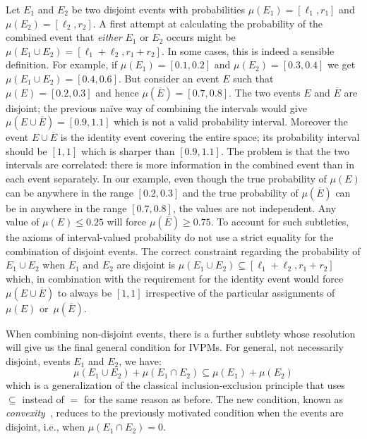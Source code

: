 \documentclass[english,reprint, aps, prl,superscriptaddress, showpacs,
showkeys, longbibliography, amsmath, amssymb]{revtex4-1}
\theoremstyle{plain}
\theoremstyle{definition}
\begin{document}
Let $E_1$ and $E_2$ be two disjoint events with probabilities
$\mu(E_1)=[\ell_1,r_1]$ and $\mu(E_2)=[\ell_2,r_2]$. A first attempt
at calculating the probability of the combined event that
\emph{either} $E_1$ or $E_2$ occurs might be
$\mu(E_1\cup E_2) = [\ell_1+\ell_2,r_1+r_2]$. In some cases, this is
indeed a sensible definition. For example, if $\mu(E_1)=[0.1,0.2]$ and
$\mu(E_2)=[0.3,0.4]$ we get $\mu(E_1\cup E_2) = [0.4,0.6]$. But
consider an event $E$ such that $\mu(E)=[0.2,0.3]$ and hence
$\mu(\overline{E})=[0.7,0.8]$. The two events $E$ and $\overline{E}$
are disjoint; the previous naïve way of combining the intervals would
give $\mu(E\cup\overline{E})=[0.9,1.1]$ which is not a valid
probability interval. Moreover the event $E\cup\overline{E}$ is the
identity event covering the entire space; its probability interval
should be $[1,1]$ which is sharper than $[0.9,1.1]$. The problem is
that the two intervals are correlated: there is more information in
the combined event than in each event separately. In our example, even
though the true probability of $\mu(E)$ can be anywhere in the range
$[0.2,0.3]$ and the true probability of $\mu(\overline{E})$ can be in
anywhere in the range $[0.7,0.8]$, the values are not independent. Any
value of $\mu(E) \leq 0.25$ will force $\mu(\overline{E})\geq
0.75$. To account for such subtleties, the axioms of interval-valued
probability do not use a strict equality for the combination of
disjoint events. The correct constraint regarding the probability of
$E_1\cup E_2$ when $E_1$ and $E_2$ are disjoint is
$\mu(E_1\cup E_2) \subseteq [\ell_1+\ell_2,r_1+r_2]$ which, in
combination with the requirement for the identity event would force
$\mu(E \cup \overline{E})$ to always be $[1,1]$ irrespective of the
particular assignments of $\mu(E)$ or~$\mu(\overline{E})$.

When combining non-disjoint events, there is a further subtlety whose
resolution will give us the final general condition for IVPMs. For
general, not necessarily disjoint, events $E_1$ and $E_2$, we have:
\begin{equation}
\mu(E_1\cup E_2) + \mu(E_1\cap E_2) \subseteq \mu(E_1) + \mu(E_2)
\label{eq:classicalconvex}
\end{equation}
which is a generalization of the classical inclusion-exclusion
principle that uses $\subseteq$ instead of $=$ for the same reason as
before. The new condition, known as
\emph{convexity}~\cite{Shapley1971,GilboaSchmeidler1994,Marinacci1999,Grabisch2016},
reduces to the previously
motivated condition when the events are disjoint, i.e., when
$\mu(E_1\cap E_2) = 0$.
\end{document}
